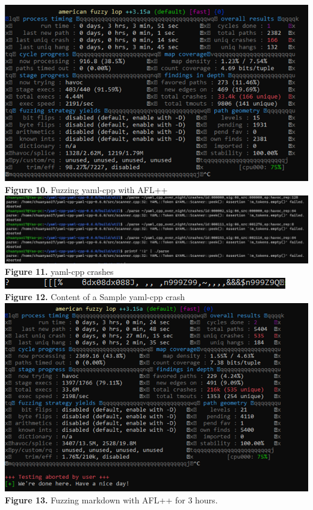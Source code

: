 \documentclass[12pt]{diazessay}
\begin{document}
\vspace{-6mm}
\begin{center}
	\includegraphics[scale=1.0, trim={0 0 7mm 0}, clip]{yamlfuzzer.png}\\
	\textbf{Figure 10.} Fuzzing yaml-cpp with AFL++\\
\vspace{6mm}
	\includegraphics[scale=0.45, trim={0 3cm 0 0}, clip]{yaml_cpp_crashes.jpg}\\
	\textbf{Figure 11.} yaml-cpp crashes\\
\vspace{6mm}
	\includegraphics[scale=1.0]{yamlsamplecrashcat.png}\\
	\textbf{Figure 12.} Content of a Sample yaml-cpp crash\\
\vspace{6mm}
	\includegraphics[scale=0.7, trim={0 0 1.5cm 0}, clip]{markdownfuzzer.png}\\
	\textbf{Figure 13.} Fuzzing markdown with AFL++ for 3 hours.\\
\end{center}
\vspace{6mm}
\end{document}
